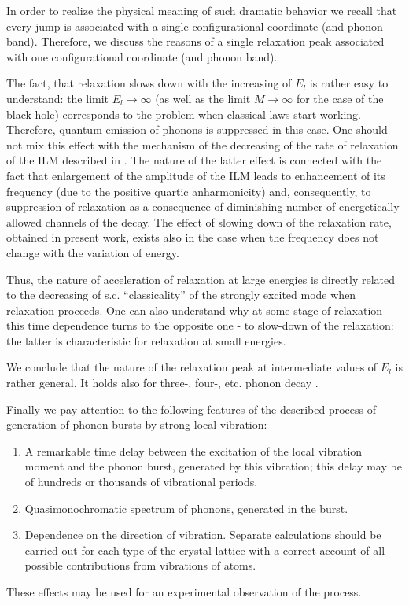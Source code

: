 In order to realize the physical meaning of such dramatic behavior we 
recall that every jump is associated with
a single configurational coordinate (and phonon band). 
Therefore, we discuss the reasons of a single relaxation peak 
associated with one configurational coordinate (and phonon band).

The fact, that relaxation slows down with the increasing of $E_{l}$ is
rather easy to understand: the limit  $E_{l} \rightarrow \infty$ (as well as 
the limit $M\rightarrow \infty$ for the case of the black hole)
corresponds to the problem when classical laws start working. 
Therefore, quantum emission of phonons  is suppressed in 
this case. One should not mix this effect
with the mechanism of the decreasing of the rate of relaxation of the
ILM described in \cite{ovchi}. The nature of the latter effect
is connected with the fact that enlargement of the amplitude of the 
ILM leads to enhancement of its frequency (due to the positive quartic
anharmonicity) and, consequently, to suppression of relaxation as a 
consequence of diminishing number of energetically allowed channels of the 
decay. The effect of slowing down of the relaxation rate, obtained in
present work, exists also in the case when the frequency does not
change with the variation of energy.

Thus, the nature of acceleration of relaxation at large energies is directly 
related to the decreasing of s.c. ``classicality''
of the strongly excited mode when relaxation proceeds. One can also 
understand why at some stage of relaxation this time dependence turns to the 
opposite one - to slow-down of the relaxation: the latter is characteristic 
for relaxation at small energies. 

We conclude that the nature of the relaxation peak at intermediate values of 
$E_{l}$ is rather general. It 
holds also for three-, four-, etc. phonon decay \cite{zhizh}. 

Finally we pay attention to the following features of the described 
process of generation of phonon bursts by strong local vibration:
\begin{enumerate}
\item A remarkable time delay between the excitation of the local vibration 
moment and the phonon burst, generated by this vibration; this delay may be 
of hundreds or thousands of vibrational
periods.
\item Quasimonochromatic spectrum of phonons, generated in the burst.
\item Dependence on the direction of vibration. Separate calculations
should be carried out for each type of the crystal lattice with a correct 
account of all possible contributions from vibrations of atoms.
\end{enumerate}
These effects may be used for an experimental observation of the process.

